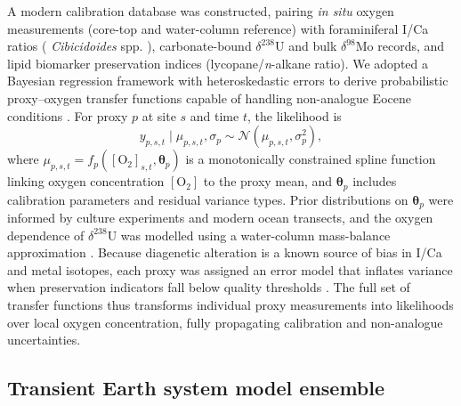 \documentclass{article}
\begin{document}
A modern calibration database was constructed, pairing \textit{in situ} oxygen measurements (core-top and water-column reference) with foraminiferal I/Ca ratios ( \textit{Cibicidoides} spp. ), carbonate-bound $\delta^{238}$U and bulk $\delta^{98}$Mo records, and lipid biomarker preservation indices (lycopane/\textit{n}-alkane ratio). We adopted a Bayesian regression framework with heteroskedastic errors to derive probabilistic proxy–oxygen transfer functions capable of handling non-analogue Eocene conditions \cite{lu2018ica, montoya2018uranium, kendall2017molybdenum, reynolds2022oxygen}. For proxy $p$ at site $s$ and time $t$, the likelihood is
\begin{equation}
y_{p,s,t} \mid \mu_{p,s,t}, \sigma_{p} \sim \mathcal{N}( \mu_{p,s,t}, \sigma_{p}^{2} ),
\end{equation}
where $\mu_{p,s,t} = f_p( [\text{O}_2]_{s,t}, \mathbf{\theta}_{p} )$ is a monotonically constrained spline function linking oxygen concentration $[\text{O}_2]$ to the proxy mean, and $\mathbf{\theta}_{p}$ includes calibration parameters and residual variance types. Prior distributions on $\mathbf{\theta}_{p}$ were informed by culture experiments and modern ocean transects, and the oxygen dependence of $\delta^{238}$U was modelled using a water-column mass-balance approximation \cite{montoya2018uranium}. Because diagenetic alteration is a known source of bias in I/Ca and metal isotopes, each proxy was assigned an error model that inflates variance when preservation indicators fall below quality thresholds \cite{lu2018ica}. The full set of transfer functions thus transforms individual proxy measurements into likelihoods over local oxygen concentration, fully propagating calibration and non-analogue uncertainties.

\subsection{Transient Earth system model ensemble}
\end{document}
